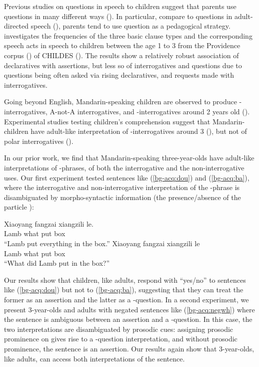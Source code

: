 Previous studies on questions in speech to children suggest that parents use questions in many different ways (\citealt{holzman1972, shatz1979, tamir1980, yu2019pedagogical}). In particular, compare to questions in adult-directed speech (\citealt{stivers2010}), parents tend to use question as a pedagogical strategy. \citealt{zaitsu2020} investigates the frequencies of the three basic clause types and the corresponding speech acts in speech to children between the age 1 to 3 from the Providence corpus (\citealt{ProvidenceCorpus}) of CHILDES (\citealt{CHILDES}). The results show a relatively robust association of declaratives with assertions, but less so of interrogatives and questions due to questions being often asked via rising declaratives, and requests made with interrogatives. %



Going beyond English, Mandarin-speaking children are observed to produce \ma-interrogatives, A-not-A interrogatives, and \twh-interrogatives around 2 years old (\citealt{miao1986acq, miao1992, lee1989acq, litang1991int, lichen1997compprod, lichen1997comp, fan2012, lijingwong2017}). Experimental studies testing children’s comprehension suggest that Mandarin-children have adult-like interpretation of \twh-interrogatives around 3 (\citealt{fahn2003acq}), but not of polar interrogatives (\citealt{moradlou2020}). 

In our prior work, we find that Mandarin-speaking three-year-olds have adult-like interpretations of \twh-phrases, of both the interrogative and the non-interrogative uses. Our first experiment tested sentences like (\ref{bg-acq:dou}) and (\ref{bg-acq:ba}), where the interrogative and non-interrogative interpretation of the \twh-phrase is disambiguated by morpho-syntactic information (the presence/absence of the particle \dou{}):

	
\gll Xiaoyang 	 	 	fangzai 	xiangzili 	le.\\
Lamb	what	\Dou{}	put 	box		\Asp{}\\
``Lamb put everything in the box.''
\eex
{}
\gll Xiaoyang	  	fangzai 	xiangzili 	le\\
	Lamb		what	put	box		\Asp{}\\
	``What did Lamb put in the box?''
\eex


Our results show that children, like adults, respond with “yes/no” to sentences like (\ref{bg-acq:dou}) but not to (\ref{bg-acq:ba}), suggesting that they can treat the former as an assertion and the latter as a \twh-question. In a second experiment, we present 3-year-olds and adults with negated sentences like (\ref{bg-acq:negwh}) where the sentence is ambiguous between an assertion and a \twh-question. In this case, the two interpretations are disambiguated by prosodic cues: assigning prosodic prominence on  gives rise to a \twh-question interpretation, and without prosodic prominence, the sentence is an assertion. Our results again show that 3-year-olds, like adults, can access both interpretations of the sentence.


